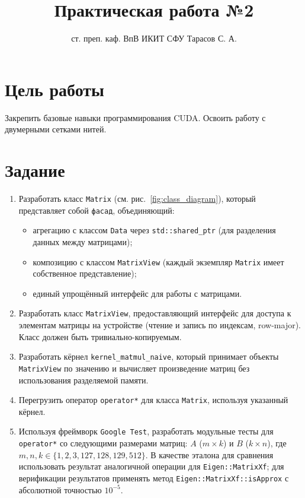 \documentclass[12pt]{article}
\title{Практическая работа №2}
\author{ст. преп. каф. ВпВ ИКИТ СФУ Тарасов С. А.}
\date{}
\begin{document}
\maketitle

\section*{Цель работы}
Закрепить базовые навыки программирования CUDA. Освоить работу с двумерными сетками нитей.

\section*{Задание}
\begin{enumerate}
    \item Разработать класс \texttt{Matrix} (см. рис.~\ref{fig:class_diagram}), который представляет собой \texttt{фасад}, объединяющий:
    \begin{itemize}
        \item агрегацию с классом \texttt{Data} через \texttt{std::shared\_ptr} (для разделения данных между матрицами);
        \item композицию с классом \texttt{MatrixView} (каждый экземпляр \texttt{Matrix} имеет собственное представление);
        \item единый упрощённый интерфейс для работы с матрицами.
    \end{itemize}

    \item Разработать класс \texttt{MatrixView}, предоставляющий интерфейс для доступа к элементам матрицы на устройстве (чтение и запись по индексам, row-major). Класс должен быть тривиально-копируемым.

    \item Разработать кёрнел \texttt{kernel\_matmul\_naive}, который принимает объекты \texttt{MatrixView} по значению и вычисляет произведение матриц без использования разделяемой памяти.

    \item Перегрузить оператор \texttt{operator*} для класса \texttt{Matrix}, используя указанный кёрнел.

    \item Используя фреймворк \texttt{Google Test}, разработать модульные тесты для \texttt{operator*} со следующими размерами матриц: $A$ ($m \times k$) и $B$ ($k \times n$), где $m, n, k \in \{1, 2, 3, 127, 128, 129, 512\}$. В качестве эталона для сравнения использовать результат аналогичной операции для \texttt{Eigen::MatrixXf}; для верификации результатов применять метод \texttt{Eigen::MatrixXf::isApprox} с абсолютной точностью $10^{-5}$.


\end{enumerate}
\end{document}
